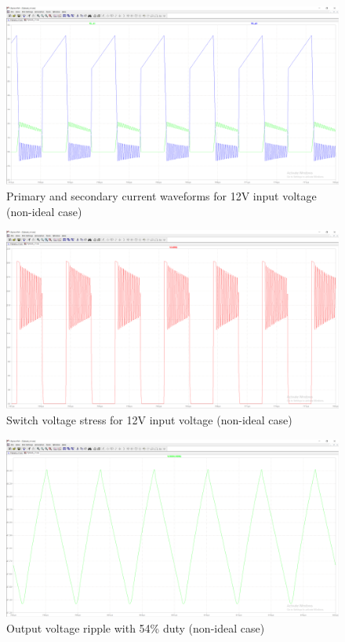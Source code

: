 \documentclass[12pt]{article}
\begin{document}
    \begin{figure}[H]
        \centering
        \includegraphics[scale=0.3]{img/Spice_Sim/Non-ideal/non-ideal_Lm_ripples_12V.PNG}
        \caption{Primary and secondary current waveforms for 12V input voltage (non-ideal case)}
        \label{fig:non-ideal_Lm_ripple}
    \end{figure}

    \begin{figure}[H]
        \centering
        \includegraphics[scale=0.3]{img/Spice_Sim/Non-ideal/non-ideal_diode_switch_stresses_Vs_12V.PNG}
        \caption{Switch voltage stress for 12V input voltage (non-ideal case)}
        \label{fig:non-ideal_V_stress}
    \end{figure}

    \begin{figure}[H]
        \centering
        \includegraphics[scale=0.3]{img/Spice_Sim/Non-ideal/non-ideal_output_54duty.PNG}
        \caption{Output voltage ripple with 54\% duty (non-ideal case)}
        \label{fig:non-ideal_output}
    \end{figure}
\end{document}
